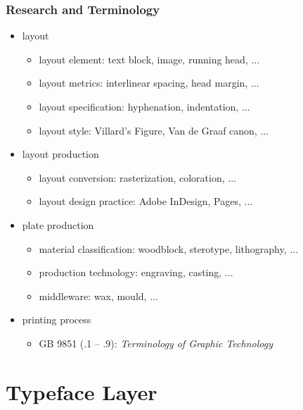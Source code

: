 \documentclass{beamer}
\begin{document}
	\begin{frame}
		\frametitle{Research and Terminology}

		\begin{itemize}
			\item layout
			\begin{itemize}
                \item layout element: text block, image, running head, ...
				\item layout metrics: interlinear spacing, head margin, ...
				\item layout specification: hyphenation, indentation, ...
				\item layout style: Villard's Figure, Van de Graaf canon, ...
            \end{itemize}
			\item layout production
			\begin{itemize}
				\item layout conversion: rasterization, coloration, ...
				\item layout design practice: Adobe InDesign, Pages, ...
			\end{itemize}
            \item plate production
			\begin{itemize}
                \item material classification: woodblock, sterotype, lithography, ...
                \item production technology: engraving, casting, ...
                \item middleware: wax, mould, ...
            \end{itemize}
            \item printing process
			\begin{itemize}
                \item GB 9851 (.1 -- .9): \textsl{Terminology of Graphic Technology}
            \end{itemize}
		\end{itemize}
	\end{frame}

    \section{Typeface Layer}
\end{document}
